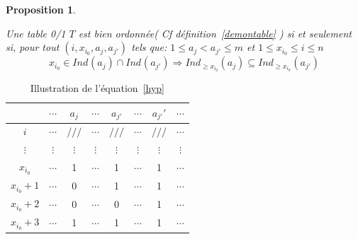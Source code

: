 \documentclass[a4paper]{report}
\newtheorem{proposition}{Proposition}[chapter]
\begin{document}
\begin{proposition}

\label{lemmedetravail}

Une table 0/1 $T$ est bien ordonnée( Cf définition~\ref{demontable} )
si et seulement si, 
pour tout $(i, x_{i_0}, a_j, a_{j'})$ tels que: $1 \leq a_j < a_{j'} \leq m$ et $1 \leq x_{i_0} \leq i \leq n$
\begin{equation}
x_{i_0} \in Ind_{}(a_j) \cap Ind_{}(a_{j'}) 
\Rightarrow
 Ind_{\geqslant x_{i_0}}(a_j) \subseteq Ind_{\geqslant x_{i_0}}(a_{j'})
\label{hyp} 
\end{equation}
\end{proposition}

\begin{table}[htb]
\centering
 \begin{tabular}{*{7}{c|} c}
     & $\cdots$ & $a_j$ & $\cdots$ & $a_{j'}$  & $\cdots$ & $a_{j'}'$ & $\cdots$\\
 \hline
   $i$ & $\cdots$ & $///$ & $\cdots$ & $///$  & $\cdots$ & $///$  & $\cdots$\\
 \hline
  $\vdots$ & $\vdots$ & $\vdots$ & $\vdots$ & $\vdots$  & $\vdots$ & $\vdots$ & $\vdots$\\
 \hline
   $x_{i_0}$ & $\cdots$ & 1 & $\cdots$ & 1 & $\cdots$ & 1 & $\cdots$\\
 \hline
   $x_{i_0} + 1$ & $\cdots$ & 0 & $\cdots$ & 1 & $\cdots$ & 1 & $\cdots$\\
 \hline
   $x_{i_0} + 2$ & $\cdots$ & 0 & $\cdots$ & 0 & $\cdots$ & 1 & $\cdots$\\
 \hline
   $x_{i_0} + 3$ & $\cdots$ & 1 & $\cdots$ & 1 & $\cdots$ & 1 & $\cdots$\\
 \end{tabular}
\caption{Illustration de l'équation~\ref{hyp}}
\end{table}
\end{document}
